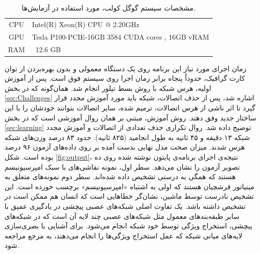 \documentclass[11pt, twoside]{imsproc}
\begin{document}
\begin{table}
\caption{مشخصات سیستم گوگل کولب، مورد استفاده در آزمایش‌ها.}
\label{tab:colabSpec}
\begin{latin}
\begin{tabular}{cl}
\hline
CPU & Intel(R) Xeon(R) CPU @ 2.20GHz\\
GPU & Tesla P100-PCIE-16GB 3584 CUDA cores , 16GB vRAM\\
RAM & ~12.6 GB\\
\hline
\end{tabular}
\end{latin}
\end{table}

زمان اجرای مورد نیاز این برنامه روی یک دستگاه معمولی
  و بدون بهره‌بردن از توان کارت گرافیک، حدوداً پنجاه برابر زمان اجرا روی سیستم فوق است.
پس از آموزش اولیه، هرس شبکه با روش بسط تیلور انجام شد. همان‌‌گونه که در بخش
\ref{sec:Challenges}
 اشاره شد، پس از حذف اتصالات، شبکه باید مورد آموزش مجدد قرار گیرد تا اثر ناشی از هرس اتصالات، ترمیم شده، سایر اتصالات بتوانند خودشان را با این ساختار جدید وفق دهند. روش آموزش، مبتنی بر همان روال آموزشی است که در بخش
 \ref{sec:learning}
  توضیح داده شد.
روال تکراری حذف تعدادی از اتصالات و آموزش مجدد شبکه ۱۳ دقیقه و ۴۵ ثانیه به طول انجامید (۸۲۵ ثانیه).
حدود ۸۳ درصد وزن‌های شبکه هرس شدند. میزان صحت مدل نهایی بدست آمده بر روی داده‌های آزمون ۹۶ درصد بوده است.
شکل
\ref{fig:output}، 
نتیجه‌ی اجرای برنامه‌ی پایتون نوشته شده روی ده تصویر آزمون را نشان می‌دهد. سطر اول، نمونه‌ نقاشی‌های با سبک امپرسیونیسم هستند که همگی به درستی تشخیص داده شده‌اند. سطر دوم نمونه‌های متعلق به مینیاتور فرشچیان هستند که اولی به اشتباه «امپرسیونیسم» برچسب خورده است.
این تشخیص نادرست توسط ماشین، نشان‌گر خطاهایی است که انسان هم ممکن است در تشخیص داشته باشد. یک تفاوت اصلی شبکه‌های عصبی پیچشی در یادگیری عمیق با سایر طبقه‌بندهای معمول مثل شبکه‌های عصبی چند لایه آن است که در شبکه‌های پیچشی، استخراج ویژگی توسط خود شبکه انجام می‌شود. برای آشنایی با بصری‌سازی لایه‌های میانی شبکه که عمل استخراج ویژگی‌ها را انجام می‌دهند، به مرجع
\cite{franoischollet2017learning}
مراجعه شود.
\end{document}
